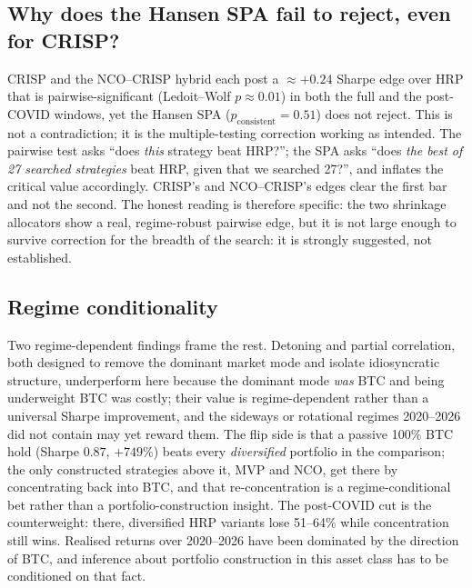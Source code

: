 \documentclass[11pt,a4paper]{article}
\begin{document}
\subsection{Why does the Hansen SPA fail to reject, even for CRISP?}
CRISP and the NCO--CRISP hybrid each post a $\approx+0.24$ Sharpe edge
over HRP that is pairwise-significant (Ledoit--Wolf $p\approx0.01$) in
both the full and the post-COVID windows, yet the Hansen SPA
($p_{\text{consistent}}=0.51$) does not reject. This is not a
contradiction; it is the multiple-testing correction working as
intended. The pairwise test asks ``does \emph{this} strategy beat
HRP?''; the SPA asks ``does \emph{the best of 27 searched strategies}
beat HRP, given that we searched 27?'', and inflates the critical
value accordingly. CRISP's and NCO--CRISP's edges clear the first bar
and not the second. The honest reading is therefore specific: the two
shrinkage allocators show a real, regime-robust pairwise edge, but it
is not large enough to survive correction for the breadth of the
search: it is strongly suggested, not established.

\subsection{Regime conditionality}
Two regime-dependent findings frame the rest. Detoning and partial
correlation, both designed to remove the dominant market mode and
isolate idiosyncratic structure, underperform here because the dominant
mode \emph{was} BTC and being underweight BTC was costly; their value
is regime-dependent rather than a universal Sharpe improvement, and
the sideways or rotational regimes 2020--2026 did not contain may yet
reward them. The flip side is that a passive 100\% BTC hold (Sharpe
$0.87$, $+749\%$) beats every \emph{diversified} portfolio in the
comparison; the only constructed strategies above it, MVP and NCO, get
there by concentrating back into BTC, and that re-concentration is a
regime-conditional bet rather than a portfolio-construction insight.
The post-COVID cut is the counterweight: there, diversified HRP
variants lose 51--64\% while concentration still wins. Realised returns
over 2020--2026 have been dominated by the direction of BTC, and
inference about portfolio construction in this asset class has to be
conditioned on that fact.
\end{document}
